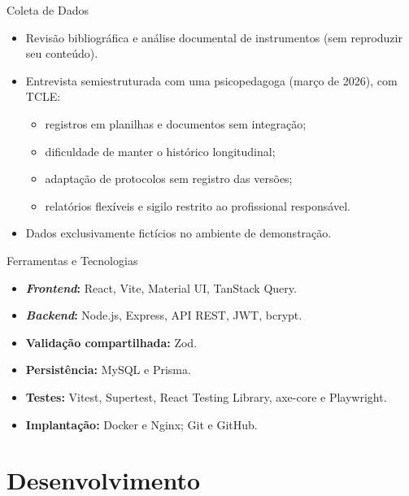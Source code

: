 \documentclass[compress]{beamer}
\begin{document}
\begin{frame}{Coleta de Dados}
\begin{itemize}
    \item Revisão bibliográfica e análise documental de instrumentos (sem reproduzir seu conteúdo).
    \item Entrevista semiestruturada com uma psicopedagoga (março de 2026), com TCLE:
    \begin{itemize}
        \small
        \item registros em planilhas e documentos sem integração;
        \item dificuldade de manter o histórico longitudinal;
        \item adaptação de protocolos sem registro das versões;
        \item relatórios flexíveis e sigilo restrito ao profissional responsável.
    \end{itemize}
    \item Dados exclusivamente fictícios no ambiente de demonstração.
\end{itemize}
\end{frame}

\begin{frame}{Ferramentas e Tecnologias}
\begin{itemize}
    \item \textbf{\textit{Frontend}:} React, Vite, Material UI, TanStack Query.
    \item \textbf{\textit{Backend}:} Node.js, Express, API REST, JWT, bcrypt.
    \item \textbf{Validação compartilhada:} Zod.
    \item \textbf{Persistência:} MySQL e Prisma.
    \item \textbf{Testes:} Vitest, Supertest, React Testing Library, axe-core e Playwright.
    \item \textbf{Implantação:} Docker e Nginx; Git e GitHub.
\end{itemize}
\end{frame}

\section{Desenvolvimento}
\end{document}

